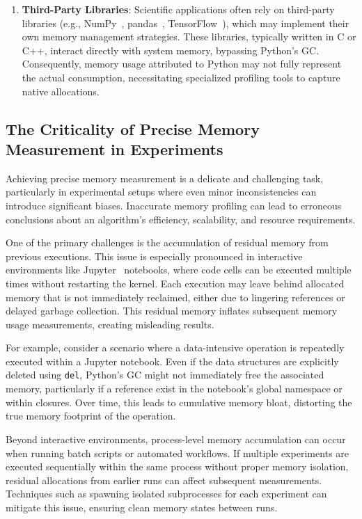 \begin{enumerate}
    \item \textbf{Third-Party Libraries}:
    Scientific applications often rely on third-party libraries (e.g., NumPy~\cite{numpy}, pandas~\cite{pandas}, TensorFlow~\cite{tensorflow}), which may implement their own memory management strategies.
    These libraries, typically written in C or C++, interact directly with system memory, bypassing Python's \ac{GC}.
    Consequently, memory usage attributed to Python may not fully represent the actual consumption, necessitating specialized profiling tools to capture native allocations.
\end{enumerate}

\subsection{The Criticality of Precise Memory Measurement in Experiments}
\label{subsec:mmc-criticality-of-precise-memory-measurement}

Achieving precise memory measurement is a delicate and challenging task, particularly in experimental setups where even minor inconsistencies can introduce significant biases.
Inaccurate memory profiling can lead to erroneous conclusions about an algorithm's efficiency, scalability, and resource requirements.

One of the primary challenges is the accumulation of residual memory from previous executions.
This issue is especially pronounced in interactive environments like Jupyter~\cite{jupyter} notebooks, where code cells can be executed multiple times without restarting the kernel.
Each execution may leave behind allocated memory that is not immediately reclaimed, either due to lingering references or delayed garbage collection.
This residual memory inflates subsequent memory usage measurements, creating misleading results.

For example, consider a scenario where a data-intensive operation is repeatedly executed within a Jupyter notebook.
Even if the data structures are explicitly deleted using \texttt{del}, Python's \ac{GC} might not immediately free the associated memory, particularly if a reference exist in the notebook's global namespace or within closures.
Over time, this leads to cumulative memory bloat, distorting the true memory footprint of the operation.

Beyond interactive environments, process-level memory accumulation can occur when running batch scripts or automated workflows.
If multiple experiments are executed sequentially within the same process without proper memory isolation, residual allocations from earlier runs can affect subsequent measurements.
Techniques such as spawning isolated subprocesses for each experiment can mitigate this issue, ensuring clean memory states between runs.

